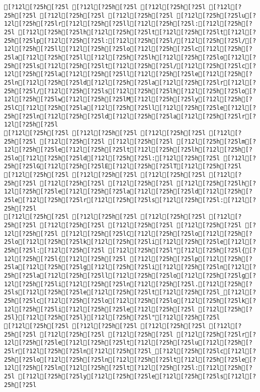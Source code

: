 \documentclass{scrartcl}
\begin{document}
\begin{Verbatim}
[?12l[?25h[?25l [?12l[?25h[?25l [?12l[?25h[?25l [?12l[?25h[?25l [?12l[?25h[?25l [?12l[?25h[?25l [?12l[?25h[?25lu[?12l[?25h[?25lr[?12l[?25h[?25ll[?12l[?25h[?25l:[?12l[?25h[?25l [?12l[?25h[?25lh[?12l[?25h[?25lt[?12l[?25h[?25lt[?12l[?25h[?25lp[?12l[?25h[?25l:[?12l[?25h[?25l/[?12l[?25h[?25l/[?12l[?25h[?25ll[?12l[?25h[?25lo[?12l[?25h[?25lc[?12l[?25h[?25la[?12l[?25h[?25ll[?12l[?25h[?25lh[?12l[?25h[?25lo[?12l[?25h[?25ls[?12l[?25h[?25lt[?12l[?25h[?25l/[?12l[?25h[?25lc[?12l[?25h[?25la[?12l[?25h[?25ll[?12l[?25h[?25le[?12l[?25h[?25ln[?12l[?25h[?25ld[?12l[?25h[?25la[?12l[?25h[?25lr[?12l[?25h[?25l/[?12l[?25h[?25ls[?12l[?25h[?25lh[?12l[?25h[?25lo[?12l[?25h[?25lw[?12l[?25h[?25lM[?12l[?25h[?25ly[?12l[?25h[?25lC[?12l[?25h[?25la[?12l[?25h[?25ll[?12l[?25h[?25le[?12l[?25h[?25ln[?12l[?25h[?25ld[?12l[?25h[?25la[?12l[?25h[?25lr[?12l[?25h[?25l
[?12l[?25h[?25l [?12l[?25h[?25l [?12l[?25h[?25l [?12l[?25h[?25l [?12l[?25h[?25l [?12l[?25h[?25l [?12l[?25h[?25lm[?12l[?25h[?25le[?12l[?25h[?25lt[?12l[?25h[?25lh[?12l[?25h[?25lo[?12l[?25h[?25ld[?12l[?25h[?25l:[?12l[?25h[?25l [?12l[?25h[?25lG[?12l[?25h[?25lE[?12l[?25h[?25lT[?12l[?25h[?25l
[?12l[?25h[?25l [?12l[?25h[?25l [?12l[?25h[?25l [?12l[?25h[?25l [?12l[?25h[?25l [?12l[?25h[?25l [?12l[?25h[?25lh[?12l[?25h[?25le[?12l[?25h[?25la[?12l[?25h[?25ld[?12l[?25h[?25le[?12l[?25h[?25lr[?12l[?25h[?25ls[?12l[?25h[?25l:[?12l[?25h[?25l
[?12l[?25h[?25l [?12l[?25h[?25l [?12l[?25h[?25l [?12l[?25h[?25l [?12l[?25h[?25l [?12l[?25h[?25l [?12l[?25h[?25l [?12l[?25h[?25l [?12l[?25h[?25lC[?12l[?25h[?25lo[?12l[?25h[?25lo[?12l[?25h[?25lk[?12l[?25h[?25li[?12l[?25h[?25le[?12l[?25h[?25l:[?12l[?25h[?25l [?12l[?25h[?25l"[?12l[?25h[?25l{[?12l[?25h[?25l{[?12l[?25h[?25l [?12l[?25h[?25lp[?12l[?25h[?25la[?12l[?25h[?25lg[?12l[?25h[?25li[?12l[?25h[?25ln[?12l[?25h[?25la[?12l[?25h[?25ll[?12l[?25h[?25lo[?12l[?25h[?25lg[?12l[?25h[?25li[?12l[?25h[?25ln[?12l[?25h[?25l.[?12l[?25h[?25ls[?12l[?25h[?25le[?12l[?25h[?25lt[?12l[?25h[?25l_[?12l[?25h[?25lc[?12l[?25h[?25lo[?12l[?25h[?25lo[?12l[?25h[?25lk[?12l[?25h[?25li[?12l[?25h[?25le[?12l[?25h[?25l [?12l[?25h[?25l}[?12l[?25h[?25l}[?12l[?25h[?25l"[?12l[?25h[?25l
[?12l[?25h[?25l [?12l[?25h[?25l [?12l[?25h[?25l [?12l[?25h[?25l [?12l[?25h[?25l [?12l[?25h[?25l [?12l[?25h[?25lr[?12l[?25h[?25le[?12l[?25h[?25lt[?12l[?25h[?25lu[?12l[?25h[?25lr[?12l[?25h[?25ln[?12l[?25h[?25l_[?12l[?25h[?25lc[?12l[?25h[?25lo[?12l[?25h[?25ln[?12l[?25h[?25lt[?12l[?25h[?25le[?12l[?25h[?25ln[?12l[?25h[?25lt[?12l[?25h[?25l:[?12l[?25h[?25l [?12l[?25h[?25ly[?12l[?25h[?25le[?12l[?25h[?25ls[?12l[?25h[?25l

\end{Verbatim}
\end{document}
